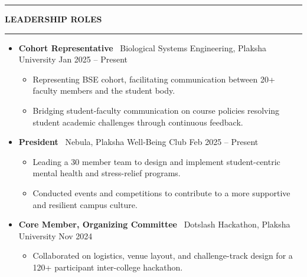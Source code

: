 \documentclass[letterpaper,9pt]{article}
\begin{document}
\vspace{0.2em}

\noindent
\begin{center}
    \rule[0.5ex]{0.36\linewidth}{0.5pt}
    \hspace{1em}
    \textbf{LEADERSHIP ROLES}
    \hspace{1em}
    \rule[0.5ex]{0.36\linewidth}{0.5pt}
\end{center}

\begin{itemize}[leftmargin=0pt, parsep=0pt, itemsep=0.8em]

\item[] \textbf{Cohort Representative} \textbar\ {Biological Systems Engineering, Plaksha University}  \hfill Jan 2025 -- Present
{\small
\begin{itemize}[leftmargin=1em, label=\textbullet, itemsep=0.2pt, parsep=0pt, topsep=1pt]
    \item Representing BSE cohort, facilitating communication between 20+ faculty members and the student body.
    \item Bridging student‐faculty communication on course policies resolving student academic challenges through continuous feedback.
\end{itemize}
}

\item[] \textbf{President} \textbar\ {Nebula, Plaksha Well-Being Club} \hfill Feb 2025 -- Present
{\small
\begin{itemize}[leftmargin=1em, label=\textbullet, itemsep=0.2pt, parsep=0pt, topsep=1pt]
    \item Leading a 30 member team to design and implement student-centric mental health and stress-relief programs.
    \item Conducted events and competitions to contribute to a more supportive and resilient campus culture.
\end{itemize}
}

\item[] \textbf{Core Member, Organizing Committee} \textbar\ {Dotslash Hackathon, Plaksha University} \hfill Nov 2024
{\small
\begin{itemize}[leftmargin=1em, label=\textbullet, itemsep=0.2pt, parsep=0pt, topsep=1pt]
    \item Collaborated on logistics, venue layout, and challenge-track design for a 120+ participant inter-college hackathon.
\end{itemize}
}


\end{itemize}
\end{document}
